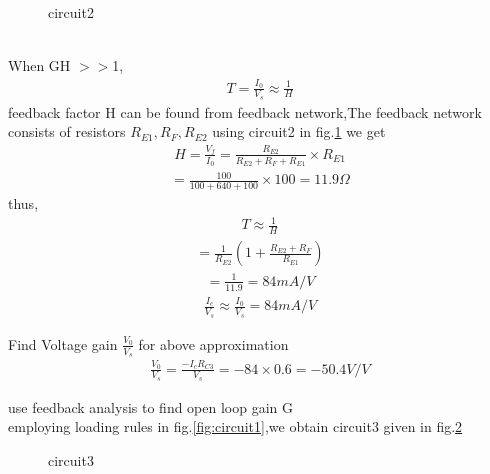 \begin{enumerate}[label=\thesubsection.\arabic*.,ref=\thesubsection.\theenumi]
{\begin{figure}[!ht]
\begin{center}
		\resizebox{\columnwidth}{!}{}
	\end{center}
\caption{circuit2}
\label{fig:circuit2}
\end{figure}
\\
\solution When GH $>>$1,
\begin{align}
    T =\frac{I_0}{V_s}\approx \frac{1}{H}
\end{align}
feedback factor H can be found from feedback network,The feedback network consists of resistors $R_{E1},R_F,R_{E2}$ using circuit2 in  fig.\ref{fig:circuit2} we get
\begin{align}
    H=\frac{V_f}{I_0}=\frac{R_{E2}}{R_{E2}+R_F+R_{E1}} \times R_{E1}
\end{align}
\begin{align}
    =\frac{100}{100+640+100}\times 100=11.9\Omega
\end{align}
thus,
\begin{align}
    T\approx \frac{1}{H}
\end{align}
\begin{align}
    =\frac{1}{R_{E2}}(1+\frac{R_{E2}+R_F}{R_{E1}})
\end{align}
\begin{align}
    =\frac{1}{11.9}=84mA/V
\end{align}
\begin{align}
\label{eq:eq1}
    \frac{I_c}{V_s}\approx\frac{I_0}{V_s}=84 mA/V
\end{align}
\item Find Voltage gain $\frac{V_0}{V_s}$ for above approximation
\\
\solution 
\begin{align}
\frac{V_0}{V_s}=\frac{-I_c R_{C3}}{V_s}=-84\times0.6=-50.4V/V
\end{align}
\item use feedback analysis to find open loop gain G 
\\
\solution employing loading rules in fig.\ref{fig:circuit1},we obtain circuit3 given in fig.\ref{fig:circuit3}
 \begin{figure}[!ht]
	\begin{center}
		
		\resizebox{\columnwidth}{!}{}
	\end{center}
\caption{circuit3}
\label{fig:circuit3}
\end{figure}
\begin{figure}[!ht]
	\begin{center}
		

\end{center}
\end{figure}}
\end{enumerate}
